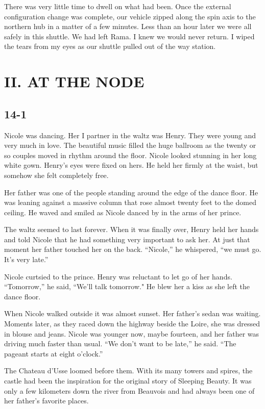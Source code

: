 \documentclass[]{article}
\begin{document}
{There was very little time to dwell on what had been.  Once the external configuration change was complete, our vehicle zipped along the spin axis to the northern hub in a matter of a few minutes.  Less than an hour later we were all safely in this shuttle.  We had left Rama.  I knew we would never return.  I wiped the tears from my eyes as our shuttle pulled out of the way station.


\section{II.  AT THE NODE}



\subsection*{14-1}

Nicole was dancing.  Her I partner in the waltz was Henry.  They were young and very much in love.  The beautiful music filled the huge ballroom as the twenty or so couples moved in rhythm around the floor.  Nicole looked stunning in her long white gown.  Henry’s eyes were fixed on hers.  He held her firmly at the waist, but somehow she felt completely free.

Her father was one of the people standing around the edge of the dance floor.  He was leaning against a massive column that rose almost twenty feet to the domed ceiling.  He waved and smiled as Nicole danced by in the arms of her prince.

The waltz seemed to last forever.  When it was finally over, Henry held her hands and told Nicole that he had something very important to ask her.  At just that moment her father touched her on the back.  “Nicole,” he whispered, “we must go.  It’s very late.”

Nicole curtsied to the prince.  Henry was reluctant to let go of her hands.  “Tomorrow,” he said, “We’ll talk tomorrow."  He blew her a kiss as she left the dance floor.

When Nicole walked outside it was almost sunset.  Her father’s sedan was waiting.  Moments later, as they raced down the highway beside the Loire, she was dressed in blouse and jeans.  Nicole was younger now, maybe fourteen, and her father was driving much faster than usual.  “We don’t want to be late,” he said.  “The pageant starts at eight o’clock.”

The Chateau d’Usse loomed before them.  With its many towers and spires, the castle had been the inspiration for the original story of Sleeping Beauty.  It was only a few kilometers down the river from Beauvois and had always been one of her father’s favorite places.

}
\end{document}
